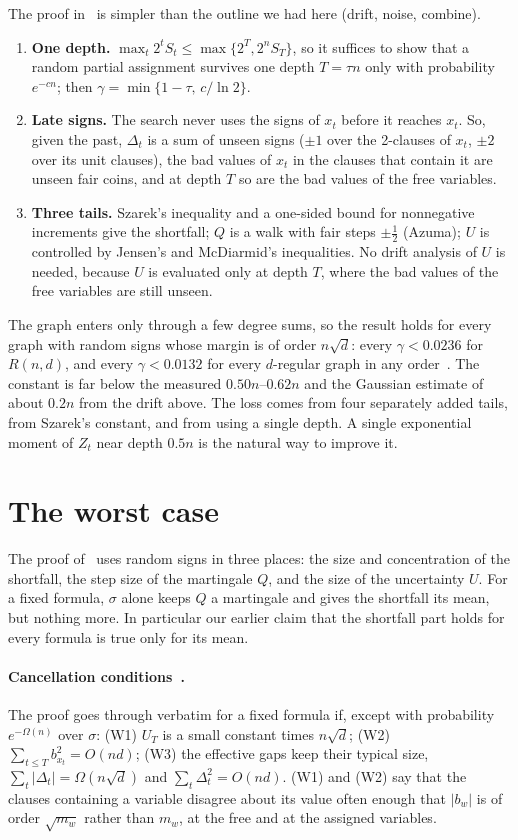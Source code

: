 \documentclass[11pt,a4paper]{article}
\theoremstyle{definition}
\theoremstyle{remark}
\begin{document}
The proof in~\cite{N8} is simpler than the outline we had here (drift, noise,
combine).
\begin{enumerate}
 \item \textbf{One depth.} $\max_t2^tS_t\le\max\{2^T,2^nS_T\}$, so it
 suffices to show that a random partial assignment survives one depth
 $T=\tau n$ only with probability $e^{-cn}$; then
 $\gamma=\min\{1-\tau,\,c/\ln2\}$.
 \item \textbf{Late signs.} The search never uses the signs of $x_t$ before
 it reaches $x_t$. So, given the past, $\Delta_t$ is a sum of unseen signs
 ($\pm1$ over the 2-clauses of $x_t$, $\pm2$ over its unit clauses), the bad
 values of $x_t$ in the clauses that contain it are unseen fair coins, and at
 depth $T$ so are the bad values of the free variables.
 \item \textbf{Three tails.} Szarek's inequality and a one-sided bound for
 nonnegative increments give the shortfall; $Q$ is a walk with fair steps
 $\pm\frac12$ (Azuma); $U$ is controlled by Jensen's and McDiarmid's
 inequalities. No drift analysis of $U$ is needed, because $U$ is evaluated
 only at depth $T$, where the bad values of the free variables are still
 unseen.
\end{enumerate}
The graph enters only through a few degree sums, so the result holds for every
graph with random signs whose margin is of order $n\sqrt d$: every
$\gamma<0.0236$ for $R(n,d)$, and every $\gamma<0.0132$ for every $d$-regular
graph in any order~\cite[Corollaries~3 and~4]{N8}. The constant is far below
the measured $0.50n$--$0.62n$ and the Gaussian estimate of about $0.2n$ from the
drift above. The loss comes from four separately added tails, from Szarek's
constant, and from using a single depth. A single exponential moment of $Z_t$
near depth $0.5n$ is the natural way to improve it.

\section{The worst case}\label{sec:worst}

The proof of~\cite{N8} uses random signs in three places: the size and
concentration of the shortfall, the step size of the martingale $Q$, and the
size of the uncertainty $U$. For a fixed formula, $\sigma$ alone keeps $Q$ a
martingale and gives the shortfall its mean, but nothing more. In particular
our earlier claim that the shortfall part holds for every formula is true only
for its mean.

\paragraph{Cancellation conditions~\cite[Section~6]{N8}.} The proof goes
through verbatim for a fixed formula if, except with probability
$e^{-\Omega(n)}$ over $\sigma$: (W1) $U_T$ is a small constant times
$n\sqrt d$; (W2) $\sum_{t\le T}b_{x_t}^2=O(nd)$; (W3) the effective gaps keep
their typical size, $\sum_t|\Delta_t|=\Omega(n\sqrt d)$ and
$\sum_t\Delta_t^2=O(nd)$. (W1) and (W2) say that the clauses containing a
variable disagree about its value often enough that $|b_w|$ is of order
$\sqrt{m_w}$ rather than $m_w$, at the free and at the assigned variables.
\end{document}
